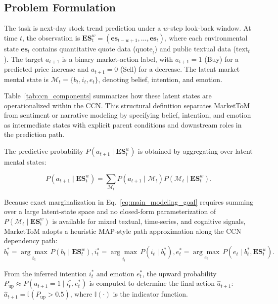 \documentclass[a4paper,fleqn,doubleblind]{cas-sc}
\newcommand{\revise}[1]{{\color{blue}#1}}
\begin{document}
\subsection{Problem Formulation}
The task is next-day stock trend prediction under a $w$-step look-back window. At time $t$, the observation is $\mathbf{ES}_{t}^{w} = (\mathbf{es}_{t-w+1}, \dots, \mathbf{es}_{t})$, where each environmental state $\mathbf{es}_{t}$ contains quantitative quote data ($\text{quote}_t$) and public textual data ($\text{text}_t$). The target $a_{t+1}$ is a binary market-action label, with $a_{t+1}=1$ (Buy) for a predicted price increase and $a_{t+1}=0$ (Sell) for a decrease. The latent market mental state is $\mathcal{M}_t=\{b_t,i_t,e_t\}$, denoting belief, intention, and emotion.

\revise{Table~\ref{tab:ccn_components} summarizes how these latent states are operationalized within the CCN. This structural definition separates MarketToM from sentiment or narrative modeling by specifying belief, intention, and emotion as intermediate states with explicit parent conditions and downstream roles in the prediction path.}

The predictive probability $P(a_{t+1} \mid \mathbf{ES}_{t}^{w})$ is obtained by aggregating over latent mental states:

\begin{equation}
    P(a_{t+1} \mid \mathbf{ES}_{t}^{w}) = \sum_{\mathcal{M}_t} P(a_{t+1} \mid \mathcal{M}_t)P(\mathcal{M}_t \mid \mathbf{ES}_{t}^{w}).
  \label{eq:main_modeling_goal}
\end{equation}

Because exact marginalization in Eq.~\ref{eq:main_modeling_goal} requires summing over a large latent-state space and no closed-form parameterization of $P(\mathcal{M}_t \mid \mathbf{ES}_{t}^{w})$ is available for mixed textual, time-series, and cognitive signals, MarketToM adopts a heuristic MAP-style path approximation along the CCN dependency path:
\begin{equation}
  b_t^* = \underset{b_t}{\arg\max} \, P(b_t \mid \mathbf{ES}_t^w), 
  i_t^* = \underset{i_t}{\arg\max} \, P(i_t \mid b_t^*), 
  e_t^* = \underset{e_t}{\arg\max} \, P(e_t \mid b_t^*, \mathbf{ES}_t^w).
\end{equation}

From the inferred intention $i_t^*$ and emotion $e_t^*$, the upward probability $P_{\text{up}} \approx P(a_{t+1}=1 \mid i_t^*, e_t^*)$ is computed to determine the final action $\hat{a}_{t+1}$: $\hat{a}_{t+1} = \mathbb{I} \left( P_{\text{up}} > 0.5 \right)$, where $\mathbb{I}(\cdot)$ is the indicator function.
\end{document}
